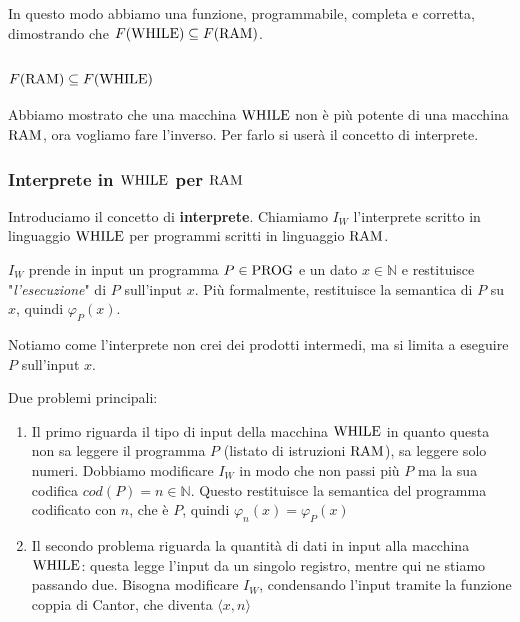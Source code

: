 In questo modo abbiamo una funzione, programmabile, completa e corretta, dimostrando che $F(\text{WHILE}) \subseteq F(\text{RAM})$.

\subsection{$F(\text{RAM}) \subseteq F(\text{WHILE})$}

Abbiamo mostrato che una macchina $\text{WHILE}$ non è più potente di una macchina $\text{RAM}$, ora vogliamo fare l'inverso. Per farlo si userà il concetto di interprete.

\subsubsection{Interprete in $\text{WHILE}$ per $\text{RAM}$}

Introduciamo il concetto di \textbf{interprete}. Chiamiamo $I_W$ l'interprete scritto in linguaggio $\text{WHILE}$ per programmi scritti in linguaggio $\text{RAM}$.

$I_W$ prende in input un programma $P \in \text{PROG}$ e un dato $x \in \mathbb{N}$ e restituisce "\textit{l'esecuzione}" di $P$ sull'input $x$. Più formalmente, restituisce la semantica di $P$ su $x$, quindi $\varphi_P (x)$.

\begin{center}
	
\end{center}

Notiamo come l'interprete non crei dei prodotti intermedi, ma si limita a eseguire $P$ sull'input $x$.

Due problemi principali: 
\begin{enumerate}
	\item Il primo riguarda il tipo di input della macchina $\text{WHILE}$ in quanto questa non sa leggere il programma $P$ (listato di istruzioni $\text{RAM}$), sa leggere solo numeri. Dobbiamo modificare $I_W$ in modo che non passi più $P$ ma la sua codifica $cod(P) = n \in \mathbb{N}$. Questo restituisce la semantica del programma codificato con $n$, che è $P$, quindi $\varphi_n (x) = \varphi_P (x)$
	
    \item Il secondo problema riguarda la quantità di dati in input alla macchina $\text{WHILE}$: questa legge l'input da un singolo registro, mentre qui ne stiamo passando due. Bisogna modificare $I_W$, condensando l'input tramite la funzione coppia di Cantor, che diventa $\langle x,n \rangle$
\end{enumerate}

